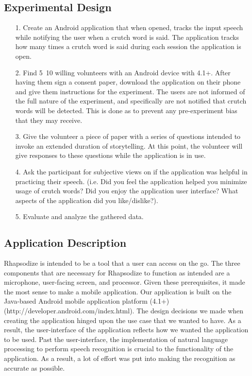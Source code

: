 \documentclass{sigchi}
\begin{document}
\subsection{Experimental Design}
\begin{itemize}
\item[1.] Create an Android application that when opened, tracks the input speech while notifying the user when a crutch word is said. The application tracks how many times a crutch word is said during each session the application is open.
\item[2.] Find 5~10 willing volunteers with an Android device with 4.1+. After having them sign a consent paper, download the application on their phone and give them instructions for the experiment. The users are not informed of the full nature of the experiment, and specifically are not notified that crutch words will be detected. This is done as to prevent any pre-experiment bias that they may receive.
\item[3.] Give the volunteer a piece of paper with a series of questions intended to invoke an extended duration of storytelling. At this point, the volunteer will give responses to these questions while the application is in use.
\item[4.] Ask the participant for subjective views on if the application was helpful in practicing their speech. (i.e. Did you feel the application helped you minimize usage of crutch words? Did you enjoy the application user interface? What aspects of the application did you like/dislike?).
\item[5.] Evaluate and analyze the gathered data. 
\end{itemize}

\subsection{Application Description}

Rhapsodize is intended to be a tool that a user can access on the go. The three components that are necessary for Rhapsodize to function as intended are a microphone, user-facing screen, and processor. Given these prerequisites, it made the most sense to make a mobile application. Our application is built on the Java-based Android mobile application platform (4.1+) (http://developer.android.com/index.html). The design decisions we made when creating the application hinged upon the use case that we wanted to have. As a result, the user-interface of the application reflects how we wanted the application to be used. Past the user-interface, the implementation of natural language processing to perform speech recognition is crucial to the functionality of the application. As a result, a lot of effort was put into making the recognition as accurate as possible.
\end{document}
